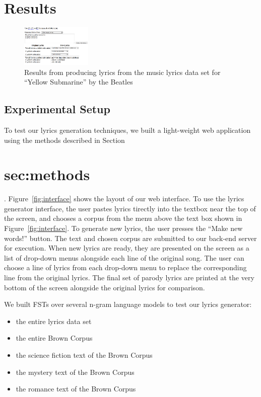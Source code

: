 \documentclass{vgtc}                          %
\begin{document}
\section{Results}
\label{sec:results}
\begin{figure}[t]
\centering
\includegraphics[width=0.3\textwidth]{images/png/yellow_submarine4.png}
\caption{Results from producing lyrics from the music lyrics data set for ``Yellow Submarine'' by the Beatles}
\label{fig:beatles}
\end{figure}


\subsection{Experimental Setup}
To test our lyrics generation techniques, we built a light-weight
web application using the methods described in Section~\section{sec:methods}.
Figure~\ref{fig:interface} shows the layout of our web interface.
To use the lyrics generator interface, the user pastes lyrics tirectly
into the textbox near the top of the screen, and chooses a corpus
from the menu above the text box shown in Figure~\ref{fig:interface}. To generate new lyrics, the user
presses the ``Make new words!'' button. The text and chosen
corpus are submitted to our back-end server for execution. When
new lyrics are ready, they are presented on the screen as a
list of drop-down menus alongside each line of the original song.
The user can choose a line of lyrics from each drop-down menu to replace
the corresponding line from the original lyrics.
The final set of parody lyrics are printed at the very bottom of the screen
alongside the original lyrics for comparison.

We built FSTs over several n-gram language models to test our lyrics generator:
\begin{itemize}
  \item the entire lyrics data set
  \item the entire Brown Corpus
  \item the science fiction text of the Brown Corpus
  \item the mystery text of the Brown Corpus
  \item the romance text of the Brown Corpus
\end{itemize}
\end{document}
